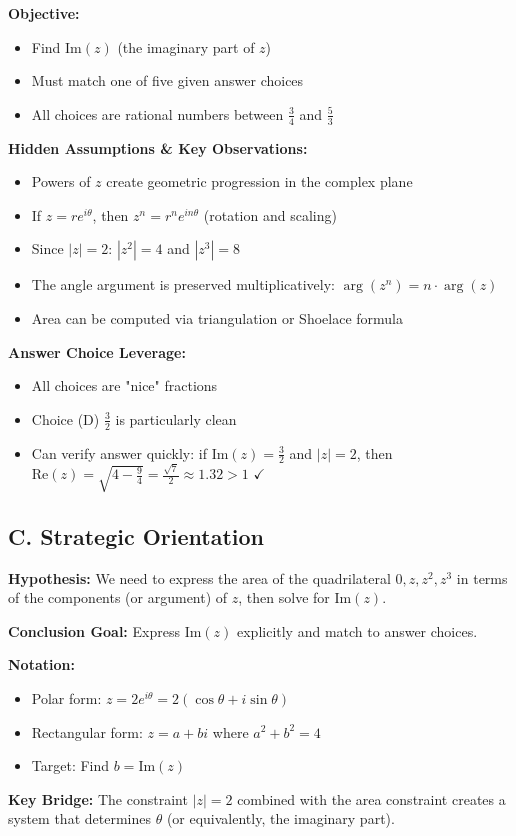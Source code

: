 \documentclass[12pt]{article}
\begin{document}
\begin{problemconfigbox}
\textbf{Objective:}
\begin{itemize}
    \item Find $\text{Im}(z)$ (the imaginary part of $z$)
    \item Must match one of five given answer choices
    \item All choices are rational numbers between $\frac{3}{4}$ and $\frac{5}{3}$
\end{itemize}

\textbf{Hidden Assumptions \& Key Observations:}
\begin{itemize}
    \item Powers of $z$ create geometric progression in the complex plane
    \item If $z = re^{i\theta}$, then $z^n = r^n e^{in\theta}$ (rotation and scaling)
    \item Since $|z| = 2$: $|z^2| = 4$ and $|z^3| = 8$
    \item The angle argument is preserved multiplicatively: $\arg(z^n) = n \cdot \arg(z)$
    \item Area can be computed via triangulation or Shoelace formula
\end{itemize}

\textbf{Answer Choice Leverage:}
\begin{itemize}
    \item All choices are "nice" fractions
    \item Choice (D) $\frac{3}{2}$ is particularly clean
    \item Can verify answer quickly: if $\text{Im}(z) = \frac{3}{2}$ and $|z| = 2$, then $\text{Re}(z) = \sqrt{4 - \frac{9}{4}} = \frac{\sqrt{7}}{2} \approx 1.32 > 1$ $\checkmark$
\end{itemize}

\subsection*{C. Strategic Orientation}

\textbf{Hypothesis:} 
We need to express the area of the quadrilateral $0, z, z^2, z^3$ in terms of the components (or argument) of $z$, then solve for $\text{Im}(z)$.

\textbf{Conclusion Goal:}
Express $\text{Im}(z)$ explicitly and match to answer choices.

\textbf{Notation:}
\begin{itemize}
    \item Polar form: $z = 2e^{i\theta} = 2(\cos\theta + i\sin\theta)$
    \item Rectangular form: $z = a + bi$ where $a^2 + b^2 = 4$
    \item Target: Find $b = \text{Im}(z)$
\end{itemize}

\textbf{Key Bridge:}
The constraint $|z| = 2$ combined with the area constraint creates a system that determines $\theta$ (or equivalently, the imaginary part).
\end{problemconfigbox}
\end{document}
